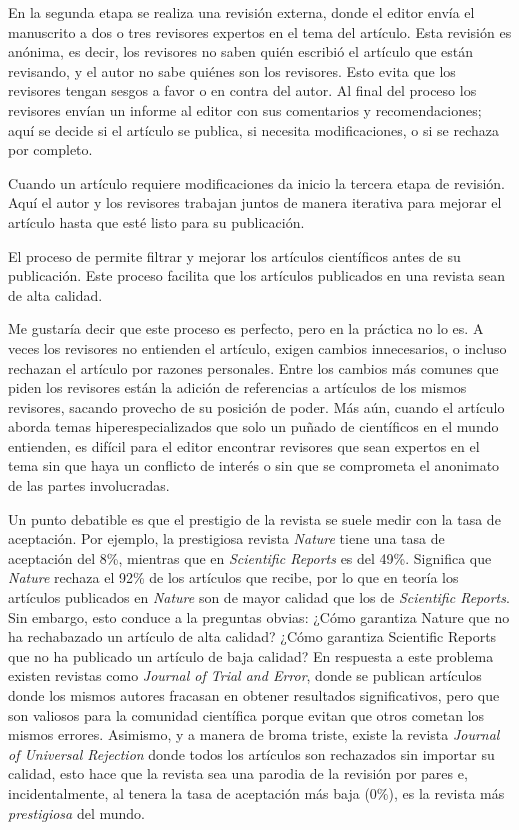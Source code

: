 En la segunda etapa se realiza una revisión externa, donde el editor envía el
manuscrito a dos o tres revisores expertos en el tema del artículo.
Esta revisión es anónima, es decir, los revisores no saben quién escribió el
artículo que están revisando, y el autor no sabe quiénes son los revisores.
Esto evita que los revisores tengan sesgos a favor o en contra del autor.
Al final del proceso los revisores envían un informe al editor con sus
comentarios y recomendaciones; aquí se decide si el artículo se publica, si
necesita modificaciones, o si se rechaza por completo.

Cuando un artículo requiere modificaciones da inicio la tercera etapa de
revisión.
Aquí el autor y los revisores trabajan juntos de manera iterativa para mejorar
el artículo hasta que esté listo para su publicación.

\begin{remember}
  El proceso de  permite filtrar y mejorar los
  artículos científicos antes de su publicación.
  Este proceso facilita que los artículos publicados en una revista sean de
  alta calidad.
\end{remember}

Me gustaría decir que este proceso es perfecto, pero en la práctica no lo es.
A veces los revisores no entienden el artículo, exigen cambios innecesarios, o
incluso rechazan el artículo por razones personales.
Entre los cambios más comunes que piden los revisores están la adición de
referencias a artículos de los mismos revisores, sacando provecho de su posición
de poder.
Más aún, cuando el artículo aborda temas hiperespecializados que solo un puñado
de científicos en el mundo entienden, es difícil para el editor encontrar
revisores que sean expertos en el tema sin que haya un conflicto de interés o
sin que se comprometa el anonimato de las partes involucradas.

Un punto debatible es que el prestigio de la revista se suele medir con la tasa
de aceptación.
Por ejemplo, la prestigiosa revista \emph{Nature} tiene una tasa de aceptación
del 8\%, mientras que en \emph{Scientific Reports} es del 49\%.
Significa que \emph{Nature} rechaza el 92\% de los artículos que recibe, por lo
que en teoría los artículos publicados en \emph{Nature} son de mayor calidad que
los de \emph{Scientific Reports}.
Sin embargo, esto conduce a la preguntas obvias:
¿Cómo garantiza Nature que no ha rechabazado un artículo de alta calidad?
¿Cómo garantiza Scientific Reports que no ha publicado un artículo de baja
calidad?
En respuesta a este problema existen revistas como \emph{Journal of Trial and
  Error}, donde se publican
artículos donde los mismos autores fracasan en obtener resultados
significativos, pero que son valiosos para la comunidad científica porque evitan
que otros cometan los mismos errores.
Asimismo, y a manera de broma triste, existe la revista \emph{Journal of
  Universal Rejection} donde todos
los artículos son rechazados sin importar su calidad, esto hace que la revista
sea una parodia de la revisión por pares e, incidentalmente, al tenera la tasa
de aceptación más baja (0\%), es la revista más \emph{prestigiosa} del mundo.

